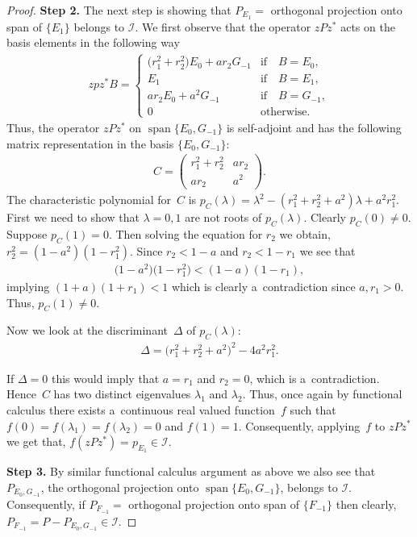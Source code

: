 \documentclass[pdftex]{sigma}
\numberwithin{equation}{section}
\begin{document}
\begin{proof}
{\bf Step 2.} The next step is showing that $P_{E_1}=$ orthogonal projection onto span of $\{E_1\}$ belongs to $\mathcal I$.
We f\/irst observe that the operator $zPz^*$ acts on the basis elements in the following way
\begin{gather*}
zpz^* B=
\begin{cases}
\big(r_1^2+r_2^2\big)E_0+ar_2G_{-1} & \text{if}\quad  B=E_0,
\\
E_1 & \text{if}\quad  B=E_1,
\\
ar_2E_0+a^2 G_{-1} & \text{if}\quad  B=G_{-1},
\\
0 & \text{otherwise}.
\end{cases}
\end{gather*}
Thus, the operator $zPz^*$ on $\operatorname{span}\{E_0, G_{-1}\}$ is self-adjoint and has the following matrix representation in the
basis $\{E_0, G_{-1}\}$:
\begin{gather*}
C=\left(
\begin{matrix}
r_1^2+r_2^2 & ar_2
\\
ar_2 & a^2
\end{matrix}
\right).
\end{gather*}
The characteristic polynomial for~$C$ is $p_C(\lambda)=\lambda^2-(r_1^2+r_2^2+a^2)\lambda+a^2r_1^2$.
First we need to show that $\lambda=0,1$ are not roots of $p_C(\lambda)$.
Clearly $p_C(0) \neq 0$.
Suppose $p_C(1)=0$.
Then solving the equation for $r_2$ we obtain, $r_2^2=(1-a^2)(1-r_1^2)$.
Since $r_2 < 1-a$ and $r_2 < 1-r_1$ we see that
\begin{gather*}
\big(1-a^2\big)\big(1-r_1^2\big) < (1-a)(1-r_1),
\end{gather*}
implying $(1+a)(1+r_1)<1$ which is clearly a~contradiction since $a, r_1 >0$.
Thus, $p_C(1)\neq 0$.

Now we look at the discriminant~$\Delta$ of $p_C(\lambda)$:
\begin{gather*}
\Delta=\big(r_1^2+r_2^2+a^2\big)^2-4a^2r_1^2.
\end{gather*}

If $\Delta=0$ this would imply that $a=r_1$ and $r_2=0$, which is a~contradiction.
Hence~$C$ has two distinct eigenvalues $\lambda_1$ and $\lambda_2$.
Thus, once again by functional calculus there exists a~continuous real valued function~$f$ such that $f(0)=
f(\lambda_1)=f(\lambda_2)=0$ and $f(1)=1$.
Consequently, applying~$f$ to $zPz^*$ we get that, $f(zPz^*)= p_{E_1} \in \mathcal I$.

{\bf Step 3.} By similar functional calculus argument as above we also see that $P_{E_0, G_{-1}}$, the orthogonal
projection onto $\operatorname{span}\{E_0, G_{-1}\}$, belongs to $\mathcal I$.
Consequently, if $P_{F_{-1}}=$ orthogonal projection onto span of $\{F_{-1}\}$ then clearly, $P_{F_{-1}}= P- P_{E_0,
G_{-1}} \in \mathcal I$.


\end{proof}
\end{document}
